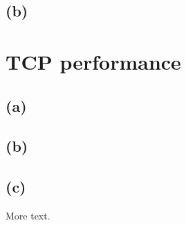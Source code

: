 \documentclass[12pt, a4paper]{article}
\begin{document}
\subsection*{(b)}

\section{TCP performance}

\subsection*{(a)}

\subsection*{(b)}

\subsection*{(c)}



More text.
\end{document}
